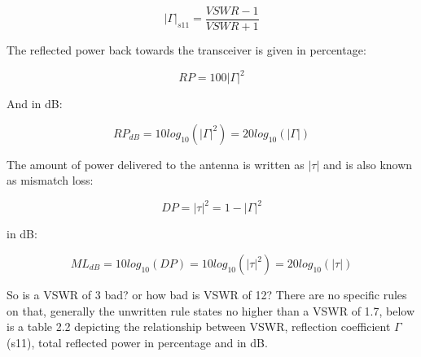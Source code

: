 \begin{equation}
   |\Gamma|_{s11}= \frac{VSWR-1}{VSWR+1}
\end{equation}

The reflected power back towards the transceiver is given in percentage:

\begin{equation}
   RP = 100|\Gamma|^2
\end{equation}

And in dB:

\begin{equation}
   RP_{dB} = 10log_{10}(|\Gamma|^2) = 20log_{10}(|\Gamma|)
\end{equation}

The amount of power delivered to the antenna is written as $|\tau|$ and is also known as mismatch loss:

\begin{equation}
   DP = |\tau|^2 = 1-|\Gamma|^2
\end{equation}

in dB:

\begin{equation}
   ML_{dB} = 10log_{10}(DP) = 10log_{10}(|\tau|^2) = 20log_{10}(|\tau|)
\end{equation}

So is a VSWR of 3 bad? or how bad is VSWR of 12? There are no specific rules on that, generally the unwritten rule states no higher than a VSWR of 1.7, below is a table 2.2 depicting the relationship between VSWR, reflection coefficient $\Gamma$ (s11), total reflected power in percentage and in dB.

